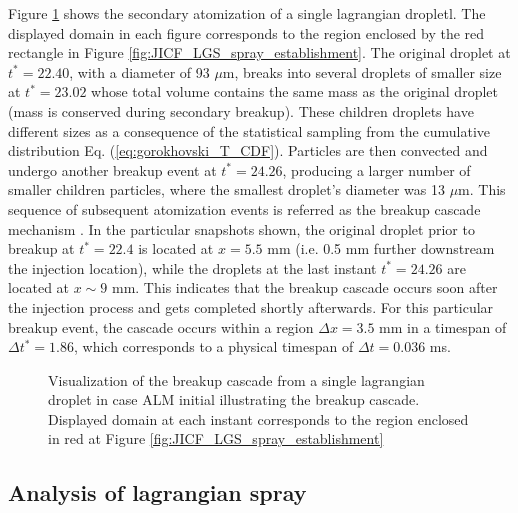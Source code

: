 Figure \ref{fig:JICF_LGS_breakup_cascade_in_ALM_figure} shows the secondary atomization of a single lagrangian dropletl. The displayed domain in each figure corresponds to the region enclosed by the red rectangle in Figure \ref{fig:JICF_LGS_spray_establishment}. The original droplet at $t^* = 22.40$, with a diameter of 93 $\mu$m, breaks into several droplets of smaller size at $t^* = 23.02$ whose total volume contains the same mass as the original droplet (mass is conserved during secondary breakup). These children droplets have different sizes as a consequence of the statistical sampling from the cumulative distribution Eq. (\ref{eq:gorokhovski_T_CDF}). Particles are then convected and undergo another breakup event at $t^* = 24.26$, producing a larger number of smaller children particles, where the smallest droplet's diameter was 13 $\mu$m. This sequence of subsequent atomization events is referred as the breakup cascade mechanism . In the particular snapshots shown, the original droplet prior to breakup at $t^* = 22.4$ is located at $x = 5.5$ mm (i.e. 0.5 mm further downstream the injection location), while the droplets at the last instant $t^* = 24.26$ are located at $x \sim 9$ mm. This indicates that the breakup cascade occurs soon after the injection process and gets completed shortly afterwards. For this particular breakup event, the cascade occurs within a region $\Delta x = 3.5$ mm in a timespan of $\Delta t^* = 1.86$, which corresponds to a physical timespan of $\Delta t = 0.036$ ms. 

\begin{figure}[h!]
	\centering	{}
	\caption[Visualization of the breakup cascade from a single lagrangian droplet in case ALM initial illustrating the breakup cascade]{Visualization of the breakup cascade from a single lagrangian droplet in case ALM initial illustrating the breakup cascade. Displayed domain at each instant corresponds to the region enclosed in red at Figure \ref{fig:JICF_LGS_spray_establishment}}	\label{fig:JICF_LGS_breakup_cascade_in_ALM_figure}
\end{figure}




\subsection{Analysis of lagrangian spray}
\label{subsec:jicf_lgs_sed_gas_phase_influence_spray_analysis}

